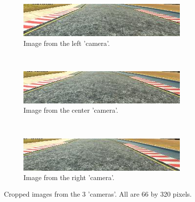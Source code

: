 \documentclass[12pt,a4paper]{article}
\begin{document}
\begin{figure}
    \centering
    \begin{subfigure}[b]{0.3\textwidth}
        \includegraphics[width=\textwidth]{left_crop.jpg}
        \caption{Image from the left 'camera'.}
        \label{fig:left_crop}
    \end{subfigure}
    ~ %
    \begin{subfigure}[b]{0.3\textwidth}
        \includegraphics[width=\textwidth]{center_crop.jpg}
        \caption{Image from the center 'camera'.}
        \label{fig:center_crop}
    \end{subfigure}
    ~ %
    \begin{subfigure}[b]{0.3\textwidth}
        \includegraphics[width=\textwidth]{right_crop.jpg}
        \caption{Image from the right 'camera'.}
        \label{fig:right_crop}
    \end{subfigure}
    \caption{Cropped images from the 3 'cameras'. All are 66 by 320 pixels.}\label{fig:images_crop}
\end{figure}
\end{document}
